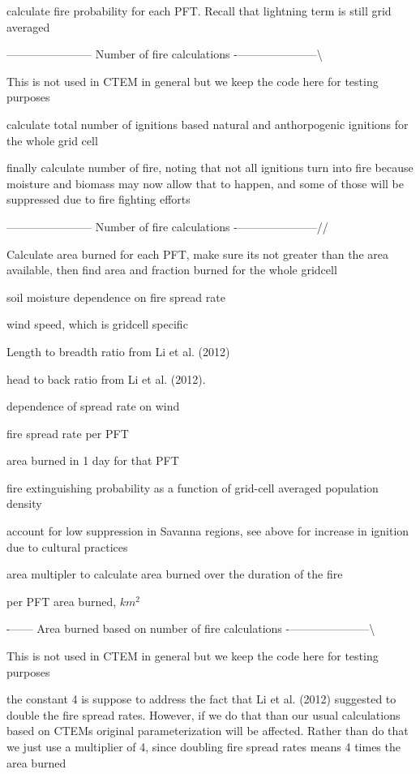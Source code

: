calculate fire probability for each P\+F\+T. Recall that lightning term is still grid averaged

----------------------- Number of fire calculations -\/---------------------\textbackslash{}

This is not used in C\+T\+E\+M in general but we keep the code here for testing purposes

calculate total number of ignitions based natural and anthorpogenic ignitions for the whole grid cell

finally calculate number of fire, noting that not all ignitions turn into fire because moisture and biomass may now allow that to happen, and some of those will be suppressed due to fire fighting efforts

----------------------- Number of fire calculations -\/---------------------//

Calculate area burned for each P\+F\+T, make sure it\textquotesingle{}s not greater than the area available, then find area and fraction burned for the whole gridcell

soil moisture dependence on fire spread rate

wind speed, which is gridcell specific

Length to breadth ratio from Li et al. (2012)

head to back ratio from Li et al. (2012).

dependence of spread rate on wind

fire spread rate per P\+F\+T

area burned in 1 day for that P\+F\+T

fire extinguishing probability as a function of grid-\/cell averaged population density

account for low suppression in Savanna regions, see above for increase in ignition due to cultural practices

area multipler to calculate area burned over the duration of the fire

per P\+F\+T area burned, $km^2$

-\/------ Area burned based on number of fire calculations -\/---------------------\textbackslash{}

This is not used in C\+T\+E\+M in general but we keep the code here for testing purposes

the constant 4 is suppose to address the fact that Li et al. (2012) suggested to double the fire spread rates. However, if we do that than our usual calculations based on C\+T\+E\+M\textquotesingle{}s original parameterization will be affected. Rather than do that we just use a multiplier of 4, since doubling fire spread rates means 4 times the area burned

